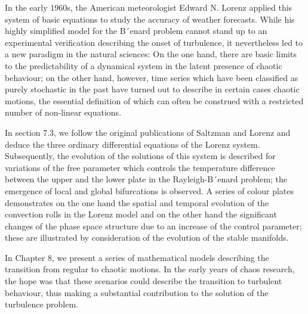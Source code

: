 \documentclass[12pt]{article}
\begin{document}
\hfill

In the early 1960s, the American meteorologist Edward N. Lorenz applied this system
of basic equations to study the accuracy of weather forecasts. While his highly
simplified model for the B´enard problem cannot stand up to an experimental verification
describing the onset of turbulence, it nevertheless led to a new paradigm in
the natural sciences: On the one hand, there are basic limits to the predictability of
a dynamical system in the latent presence of chaotic behaviour; on the other hand,
however, time series which have been classified as purely stochastic in the past have
turned out to describe in certain cases chaotic motions, the essential definition of
which can often be construed with a restricted number of non-linear equations.

\hfill

In section 7.3, we follow the original publications of Saltzman and Lorenz and deduce
the three ordinary differential equations of the Lorenz system. Subsequently,
the evolution of the solutions of this system is described for variations of the free
parameter which controls the temperature difference between the upper and the
lower plate in the Rayleigh-B´enard problem; the emergence of local and global bifurcations
is observed. A series of colour plates demonstrates on the one hand the
spatial and temporal evolution of the convection rolls in the Lorenz model and
on the other hand the significant changes of the phase space structure due to an
increase of the control parameter; these are illustrated by consideration of the evolution
of the stable manifolds.

\hfill

In Chapter 8, we present a series of mathematical models describing the transition
from regular to chaotic motions. In the early years of chaos research, the hope was
that these scenarios could describe the transition to turbulent behaviour, thus making
a substantial contribution to the solution of the turbulence problem.

\hfill
\end{document}
